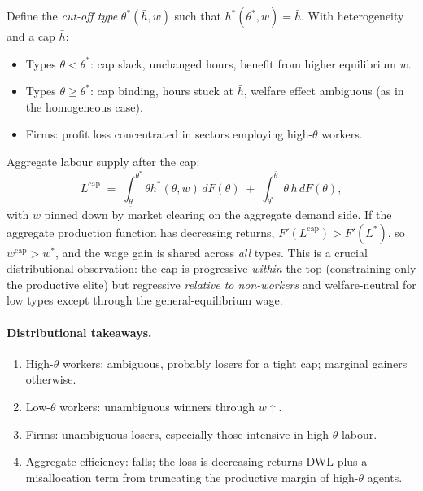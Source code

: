 \documentclass[11pt,a4paper]{article}
\begin{document}
Define the \emph{cut-off type} $\theta^{*}(\bar h,w)$ such that $h^{*}(\theta^{*},w)=\bar h$. With heterogeneity and a cap $\bar h$:
\begin{itemize}[leftmargin=*,itemsep=2pt]
    \item Types $\theta<\theta^{*}$: cap slack, unchanged hours, benefit from higher equilibrium $w$.
    \item Types $\theta\geq\theta^{*}$: cap binding, hours stuck at $\bar h$, welfare effect ambiguous (as in the homogeneous case).
    \item Firms: profit loss concentrated in sectors employing high-$\theta$ workers.
\end{itemize}

Aggregate labour supply after the cap:
\begin{equation}
L^{\text{cap}}\;=\;\int_{\underline\theta}^{\theta^{*}}\!\theta h^{*}(\theta,w)\,dF(\theta)\;+\;\int_{\theta^{*}}^{\bar\theta}\!\theta\,\bar h\,dF(\theta),
\label{eq:q4_Lcap}
\end{equation}
with $w$ pinned down by market clearing on the aggregate demand side. If the aggregate production function has decreasing returns, $F'(L^{\text{cap}})>F'(L^{*})$, so $w^{\text{cap}}>w^{*}$, and the wage gain is shared across \emph{all} types. This is a crucial distributional observation: the cap is progressive \emph{within} the top (constraining only the productive elite) but regressive \emph{relative to non-workers} and welfare-neutral for low types except through the general-equilibrium wage.

\paragraph{Distributional takeaways.}
\begin{enumerate}[leftmargin=*,itemsep=2pt]
    \item High-$\theta$ workers: ambiguous, probably losers for a tight cap; marginal gainers otherwise.
    \item Low-$\theta$ workers: unambiguous winners through $w\uparrow$.
    \item Firms: unambiguous losers, especially those intensive in high-$\theta$ labour.
    \item Aggregate efficiency: falls; the loss is decreasing-returns DWL plus a misallocation term from truncating the productive margin of high-$\theta$ agents.
\end{enumerate}
\end{document}
